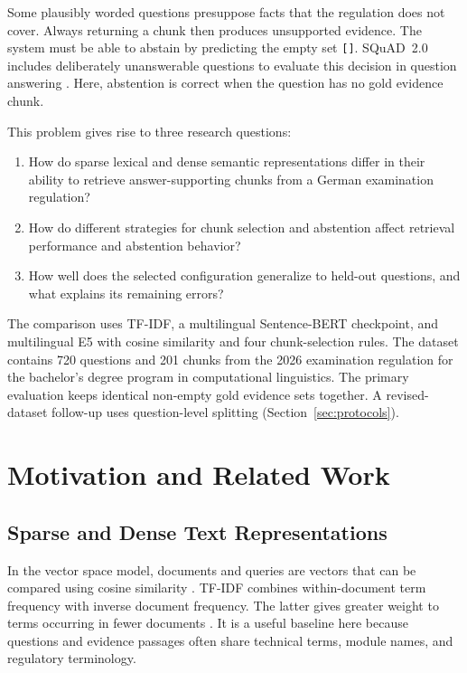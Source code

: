 \documentclass[11pt]{article}
\begin{document}
Some plausibly worded questions presuppose facts that the regulation does not cover. Always returning a chunk then produces unsupported evidence. The system must be able to abstain by predicting the empty set \texttt{[]}. SQuAD~2.0 includes deliberately unanswerable questions to evaluate this decision in question answering \citep{rajpurkar-etal-2018-know}. Here, abstention is correct when the question has no gold evidence chunk.

This problem gives rise to three research questions:

\begin{enumerate}
    \item[\textbf{RQ1}] How do sparse lexical and dense semantic representations differ in their ability to retrieve answer-supporting chunks from a German examination regulation?
    \item[\textbf{RQ2}] How do different strategies for chunk selection and abstention affect retrieval performance and abstention behavior?
    \item[\textbf{RQ3}] How well does the selected configuration generalize to held-out questions, and what explains its remaining errors?
\end{enumerate}

The comparison uses TF-IDF, a multilingual Sentence-BERT checkpoint, and multilingual E5 with cosine similarity and four chunk-selection rules. The dataset contains 720 questions and 201 chunks from the 2026 examination regulation for the bachelor's degree program in computational linguistics. The primary evaluation keeps identical non-empty gold evidence sets together. A revised-dataset follow-up uses question-level splitting (Section~\ref{sec:protocols}).

\section{Motivation and Related Work}

\subsection{Sparse and Dense Text Representations}

In the vector space model, documents and queries are vectors that can be compared using cosine similarity \citep{salton1975vector}. TF-IDF combines within-document term frequency with inverse document frequency. The latter gives greater weight to terms occurring in fewer documents \citep{sparckjones1972statistical}. It is a useful baseline here because questions and evidence passages often share technical terms, module names, and regulatory terminology.
\end{document}
